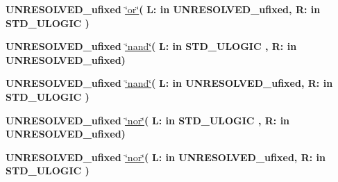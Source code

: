 \begin{DoxyCompactItemize}
\item 
{\bfseries {\bfseries \textcolor{vhdlchar}{U\+N\+R\+E\+S\+O\+L\+V\+E\+D\+\_\+ufixed}\textcolor{vhdlchar}{ }}} \hyperlink{class__fixed__pkg_a7478113186ff6e837bec25be51e9189d}{\char`\"{}or\char`\"{}}{\bfseries  ( }{\bfseries \textcolor{vhdlchar}{L\+: }\textcolor{stringliteral}{in }\textcolor{vhdlchar}{U\+N\+R\+E\+S\+O\+L\+V\+E\+D\+\_\+ufixed}}{\bfseries  , \textcolor{vhdlchar}{R\+: }\textcolor{stringliteral}{in }{\bfseries \textcolor{comment}{S\+T\+D\+\_\+\+U\+L\+O\+G\+I\+C}\textcolor{vhdlchar}{ }}}{\bfseries  )} 
\item 
{\bfseries {\bfseries \textcolor{vhdlchar}{U\+N\+R\+E\+S\+O\+L\+V\+E\+D\+\_\+ufixed}\textcolor{vhdlchar}{ }}} \hyperlink{class__fixed__pkg_a7f184ca9ccba784bb97a047a76132c1d}{\char`\"{}nand\char`\"{}}{\bfseries  ( }{\bfseries \textcolor{vhdlchar}{L\+: }\textcolor{stringliteral}{in }{\bfseries \textcolor{comment}{S\+T\+D\+\_\+\+U\+L\+O\+G\+I\+C}\textcolor{vhdlchar}{ }}}{\bfseries  , \textcolor{vhdlchar}{R\+: }\textcolor{stringliteral}{in }\textcolor{vhdlchar}{U\+N\+R\+E\+S\+O\+L\+V\+E\+D\+\_\+ufixed}}{\bfseries  )} 
\item 
{\bfseries {\bfseries \textcolor{vhdlchar}{U\+N\+R\+E\+S\+O\+L\+V\+E\+D\+\_\+ufixed}\textcolor{vhdlchar}{ }}} \hyperlink{class__fixed__pkg_a7f184ca9ccba784bb97a047a76132c1d}{\char`\"{}nand\char`\"{}}{\bfseries  ( }{\bfseries \textcolor{vhdlchar}{L\+: }\textcolor{stringliteral}{in }\textcolor{vhdlchar}{U\+N\+R\+E\+S\+O\+L\+V\+E\+D\+\_\+ufixed}}{\bfseries  , \textcolor{vhdlchar}{R\+: }\textcolor{stringliteral}{in }{\bfseries \textcolor{comment}{S\+T\+D\+\_\+\+U\+L\+O\+G\+I\+C}\textcolor{vhdlchar}{ }}}{\bfseries  )} 
\item 
{\bfseries {\bfseries \textcolor{vhdlchar}{U\+N\+R\+E\+S\+O\+L\+V\+E\+D\+\_\+ufixed}\textcolor{vhdlchar}{ }}} \hyperlink{class__fixed__pkg_a225239da021f68739471cff06638c197}{\char`\"{}nor\char`\"{}}{\bfseries  ( }{\bfseries \textcolor{vhdlchar}{L\+: }\textcolor{stringliteral}{in }{\bfseries \textcolor{comment}{S\+T\+D\+\_\+\+U\+L\+O\+G\+I\+C}\textcolor{vhdlchar}{ }}}{\bfseries  , \textcolor{vhdlchar}{R\+: }\textcolor{stringliteral}{in }\textcolor{vhdlchar}{U\+N\+R\+E\+S\+O\+L\+V\+E\+D\+\_\+ufixed}}{\bfseries  )} 
\item 
{\bfseries {\bfseries \textcolor{vhdlchar}{U\+N\+R\+E\+S\+O\+L\+V\+E\+D\+\_\+ufixed}\textcolor{vhdlchar}{ }}} \hyperlink{class__fixed__pkg_a225239da021f68739471cff06638c197}{\char`\"{}nor\char`\"{}}{\bfseries  ( }{\bfseries \textcolor{vhdlchar}{L\+: }\textcolor{stringliteral}{in }\textcolor{vhdlchar}{U\+N\+R\+E\+S\+O\+L\+V\+E\+D\+\_\+ufixed}}{\bfseries  , \textcolor{vhdlchar}{R\+: }\textcolor{stringliteral}{in }{\bfseries \textcolor{comment}{S\+T\+D\+\_\+\+U\+L\+O\+G\+I\+C}\textcolor{vhdlchar}{ }}}{\bfseries  )} 

\end{DoxyCompactItemize}
